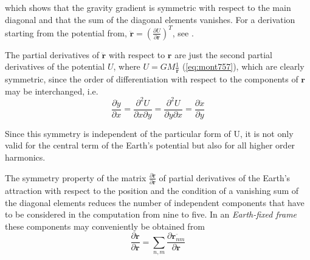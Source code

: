 which shows that the gravity gradient is symmetric with respect to the main diagonal
and that the sum of the diagonal elements vanishes. For a derivation starting from 
the potential from, 
$\ddot{\bm{r}} = \left( \frac{\partial U}{\partial \bm{r}} \right) ^T$,
see \cite{Montenbruck2000}.

The partial derivatives of $\ddot{\bm{r}}$ with respect to $\bm{r}$ are just the 
second partial derivatives of the potential $U$, where $U=GM\frac{1}{\bm{r}}$ 
(\ref{eq:mont757}), which are clearly symmetric, since the order of 
differentiation with respect to the components of $\bm{r}$ may be interchanged, 
i.e. \cite{Montenbruck2000}
\begin{equation}
  \label{eq:mont760}
  \frac{\partial \ddot{y}}{\partial x} = 
  \frac{\partial ^2 U}{\partial x \partial y} =
  \frac{\partial ^2 U}{\partial y \partial x} = 
  \frac{\partial \ddot{x}}{\partial y}
\end{equation}

Since this symmetry is independent of the particular form of U, it is not only valid
for the central term of the Earth's potential but also for all higher order harmonics.

The symmetry property of the matrix $\frac{\partial \ddot{\bm{r}}}{\partial \bm{r}}$ 
of partial derivatives of the Earth's attraction with respect to the position 
and the condition of a vanishing sum of the diagonal elements reduces the number 
of independent components that have to be considered in the computation from 
nine to five. In an \emph{Earth-fixed frame} these components may conveniently be 
obtained from
\begin{equation}
  \label{eq:mont764}
  \frac{\partial \ddot{\bm{r}}}{\partial \bm{r}} = 
    \sum_{n,m} \frac{\partial \ddot{\bm{r}_{nm}}}{\partial \bm{r}}
\end{equation}

